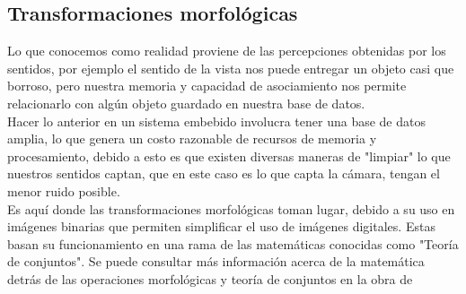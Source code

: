 \subsection{Transformaciones morfológicas}
Lo que conocemos como realidad proviene de las percepciones obtenidas por los sentidos, por ejemplo el sentido de la vista
nos puede entregar un objeto casi que borroso, pero nuestra memoria y capacidad de asociamiento nos permite relacionarlo con
algún objeto guardado en nuestra base de datos.\\
Hacer lo anterior en un sistema embebido involucra tener una base de datos amplia, lo que genera un costo razonable de recursos
de memoria y procesamiento, debido a esto es que existen diversas maneras de "limpiar" lo que nuestros sentidos captan, que en
este caso es lo que capta la cámara, tengan el menor ruido posible.\\
Es aquí donde las transformaciones morfológicas toman lugar, debido a su uso en imágenes binarias que permiten simplificar
el uso de imágenes digitales. Estas basan su funcionamiento en una rama de las matemáticas conocidas como "Teoría de conjuntos".
Se puede consultar más información acerca de la matemática detrás de las operaciones morfológicas y teoría de conjuntos en la
obra de \cite{Book:Serra1984} %
